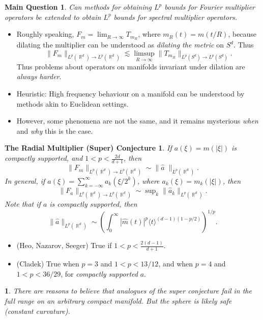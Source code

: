 \documentclass[usenames,dvipsnames,10pt]{beamer}
\DeclareMathOperator{\RR}{\mathbb{R}}
\newtheorem*{mainquestion}{Main Question}
\newtheorem*{nothing}{}
\newtheorem*{superconjecture}{The Radial Multiplier (Super) Conjecture}
\begin{document}
\begin{frame}
    \begin{mainquestion}
        Can methods for obtaining $L^p$ bounds for Fourier multiplier operators be extended to obtain $L^p$ bounds for spectral multiplier operators.
    \end{mainquestion}

    \begin{itemize}
        \pause
        \item Roughly speaking, $F_m = \lim_{R \to \infty} T_{m_R}$,  where $m_R(t) = m(t / R)$, because dilating the multiplier can be understood as \emph{dilating the metric} on $S^d$. Thus
        \[ \| F_m \|_{L^p(\RR^d) \to L^p(\RR^d)} \lesssim \limsup_{R \to \infty} \| T_{m_R} \|_{L^p(S^d) \to L^p(S^d)}. \]
        Thus problems about operators on manifolds invariant under dilation are \emph{always harder}.

        \pause
        \item Heuristic: High frequency behaviour on a manifold can be understood by methods akin to Euclidean settings.

        \pause
        \item However, some phenomena are not the same, and it remains mysterious \emph{when} and \emph{why} this is the case.
    \end{itemize}
\end{frame}

\begin{frame}
    \small
    \begin{superconjecture}
        If $a(\xi) = m(|\xi|)$ is compactly supported, and $1 < p < \frac{2d}{d+1}$, then
        \[ \| F_m \|_{L^p(\RR^d) \to L^p(\RR^d)} \sim \| \widehat{a}\; \|_{L^p(\RR^d)}. \]
        \pause
        In general, if $a(\xi) = \sum_{k = -\infty}^\infty a_k(\xi / 2^k)$, where $a_k(\xi) = m_k(|\xi|)$, then
        \[ \| F_a \|_{L^p(\RR^d) \to L^p(\RR^d)} \sim \sup\nolimits_k \| \widehat{a}_k \|_{L^p(\RR^d)}. \]
        \pause
        Note that if $a$ is compactly supported, then
        \[ \| \widehat{a} \|_{L^p(\RR^d)} \sim \left( \int_0^\infty |\widehat{m}(t)|^p \langle t \rangle^{(d-1)(1 - p/2)} \right)^{1/p}. \]
    \end{superconjecture}
    \normalsize

    \begin{itemize}
        \pause
        \item (Heo, Nazarov, Seeger) True if $1 < p < \frac{2(d-1)}{d+1}$.

        \item (Cladek) True when $p = 3$ and $1 < p < 13/12$, and when $p = 4$ and $1 < p < 36/29$, for \emph{compactly supported} $a$.
    \end{itemize}

    \pause
    \begin{nothing}
        There are reasons to believe that analogues of the super conjecture fail in the full range on an arbitrary compact manifold. But the sphere is \emph{likely safe} (constant curvature).
    \end{nothing}
\end{frame}
\end{document}
